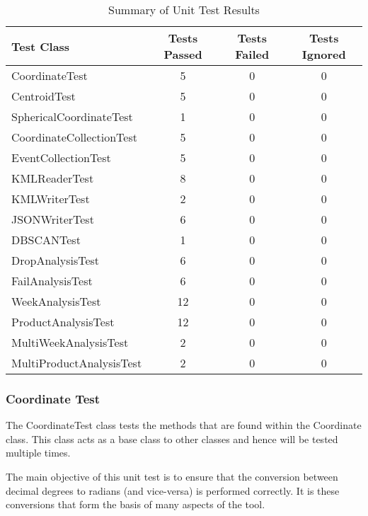 \begin{table}[h]
  \centering
  \begin{tabular}{|l|c|c|c|}
    \hline
    {\bfseries Test Class}   & {\bfseries Tests Passed} & 
    {\bfseries Tests Failed} & {\bfseries Tests Ignored} \\ 
    \hline
    CoordinateTest           & 5    & 0   & 0   \\ 
    CentroidTest             & 5    & 0   & 0   \\
    SphericalCoordinateTest  & 1    & 0   & 0   \\
    CoordinateCollectionTest & 5    & 0   & 0   \\
    EventCollectionTest      & 5    & 0   & 0   \\    
    KMLReaderTest            & 8    & 0   & 0   \\  
    KMLWriterTest            & 2    & 0   & 0   \\
    JSONWriterTest           & 6    & 0   & 0   \\
    DBSCANTest               & 1    & 0   & 0   \\
    DropAnalysisTest         & 6    & 0   & 0   \\ 
    FailAnalysisTest         & 6    & 0   & 0   \\ 
    WeekAnalysisTest         & 12   & 0   & 0   \\ 
    ProductAnalysisTest      & 12   & 0   & 0   \\ 
    MultiWeekAnalysisTest    & 2    & 0   & 0   \\
    MultiProductAnalysisTest & 2    & 0   & 0   \\
    \hline
  \end{tabular}
  \caption[Summary of Unit Test Results]
          {Summary of Unit Test Results}
  \label{tab:test_class_summary}
\end{table}


\subsubsection{Coordinate Test}

The {\ttfamily CoordinateTest} class tests the methods that are found 
within the Coordinate class. This class acts as a base class to other classes 
and hence will be tested multiple times.

The main objective of this unit test is to ensure that the conversion between 
decimal degrees to radians (and vice-versa) is performed correctly. It is these 
conversions that form the basis of many aspects of the tool.

